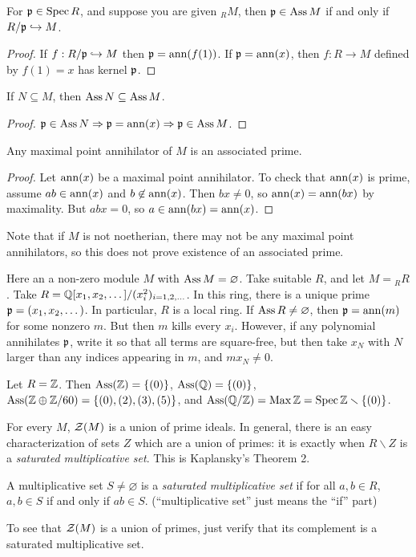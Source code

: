  \begin{lemma}
   For $\mathfrak{p}\in \operatorname{Spec} R$, and suppose you are given ${}_R M$, then $\mathfrak{p}\in \operatorname{Ass} M$ if and
   only if $R/\mathfrak{p}\hookrightarrow M$.
 \end{lemma}
 \begin{proof}
   If $f:R/\mathfrak{p}\hookrightarrow M$ then $\mathfrak{p} = \operatorname{ann} (f(1))$. If $\mathfrak{p}=\operatorname{ann}(x)$, then $f:R\to M$
   defined by $f(1)=x$ has kernel $\mathfrak{p}$.
 \end{proof}
 \begin{lemma}\label{lec04L:assinclusion}
   If $N\subseteq M$, then $\operatorname{Ass} N\subseteq \operatorname{Ass} M$.
 \end{lemma}
 \begin{proof}
   $\mathfrak{p}\in \operatorname{Ass} N\Rightarrow \mathfrak{p}=\operatorname{ann}(x)\Rightarrow \mathfrak{p}\in \operatorname{Ass} M$.
 \end{proof}
 \begin{lemma}[Herstein]
   Any maximal point annihilator of $M$ is an associated prime.
 \end{lemma}
 \begin{proof}
   Let $\operatorname{ann}(x)$ be a maximal point annihilator. To check that $\operatorname{ann}(x)$ is prime,
   assume $ab\in \operatorname{ann}(x)$ and $b\not\in \operatorname{ann}(x)$. Then $bx\neq 0$, so $\operatorname{ann}(x)=
   \operatorname{ann}(bx)$ by maximality. But $abx=0$, so $a\in \operatorname{ann}(bx)=\operatorname{ann}(x)$.
 \end{proof}
   Note that if $M$ is not noetherian, there may not be any maximal point annihilators, so
   this does not prove existence of an associated prime.
 \begin{example}
   Here an a non-zero module $M$ with $\operatorname{Ass} M=\varnothing$. Take suitable $R$, and let
   $M = {}_R R$. Take $R = \mathbb{Q}[x_1,x_2,\dots]/(x_i^2)_{i=1,2,\dots}$. In this ring,
   there is a unique prime $\mathfrak{p} = (x_1,x_2,\dots)$. In particular, $R$ is a local ring.
   If $\operatorname{Ass} R\neq \varnothing$, then $\mathfrak{p}=\operatorname{ann} (m)$ for some nonzero $m$. But then $m$
   kills every $x_i$. However, if any polynomial annihilates $\mathfrak{p}$, write it so that all
   terms are square-free, but then take $x_N$ with $N$ larger than any indices appearing
   in $m$, and $mx_N\neq 0$.
 \end{example}
 \begin{example}
    Let $R=\mathbb{Z}$. Then $\operatorname{Ass}(\mathbb{Z}) = \{(0)\}$, $\operatorname{Ass}(\mathbb{Q}) = \{(0)\}$, $\operatorname{Ass}(\mathbb{Z}\oplus
    \mathbb{Z}/60)=\{(0),(2),(3),(5)\}$, and $\operatorname{Ass}(\mathbb{Q}/\mathbb{Z})=\operatorname{Max} \mathbb{Z} = \operatorname{Spec} \mathbb{Z}\smallsetminus
    \{(0)\}$.
 \end{example}
 For every $M$, $\mathcal{Z}(M)$ is a union of prime ideals. In general, there is an easy
 characterization of sets $Z$ which are a union of primes: it is exactly when
 $R\smallsetminus Z$ is a \emph{saturated multiplicative set}. This is Kaplansky's
 Theorem 2.
 \begin{definition}
   A multiplicative set $S\neq \varnothing$ is a \emph{saturated multiplicative set} if
   for all $a,b\in R$, $a,b\in S$ if and only if $ab\in S$. (``multiplicative set'' just
   means the ``if'' part)
 \end{definition}
 To see that $\mathcal{Z}(M)$ is a union of primes, just verify that its complement is a saturated
 multiplicative set.

